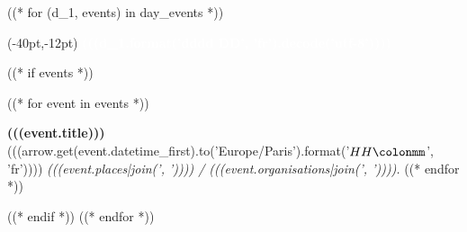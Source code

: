 \documentclass[a4paper,landscape,12pt]{article}
\newcommand{\carre}[1]{\colorbox{festif}{\textcolor{festif}{\texttt{O}}}}
\newcommand{\evenement}[4]{\textbf{#1}\\{#2 }\textit{#3 / #4.}}
\begin{document}
\pagestyle{empty}

((* for (d_1, events) in day_events *))

\begin{textblock*}{280pt}(-40pt,-12pt)
\fontsize{5}{55}\selectfont
\textcolor{white}{\textbf{(((d_1.format('dddd DD', 'fr').decode('utf-8'))))}}
\end{textblock*}
\vfill
\fontsize{32}{32}\selectfont
((* if events *))
\begin{description}
((* for event in events *))
	\item[\carre{(((event.type)))}] \evenement{(((event.title)))}{(((arrow.get(event.datetime_first).to('Europe/Paris').format('$HH\colonmm$', 'fr'))))}{(((event.places|join(', '))))}{(((event.organisations|join(', '))))}
((* endfor *))
\end{description}
((* endif *))
\vfill
\pagebreak
((* endfor *))
\end{document}
